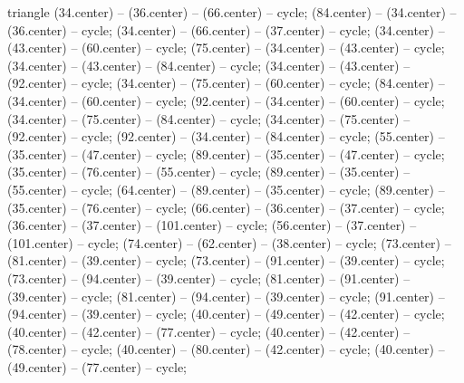 \begin{pgfonlayer}{triangle}
 (34.center) -- (36.center) -- (66.center) -- cycle; 
 (84.center) -- (34.center) -- (36.center) -- cycle; 
 (34.center) -- (66.center) -- (37.center) -- cycle; 
 (34.center) -- (43.center) -- (60.center) -- cycle; 
 (75.center) -- (34.center) -- (43.center) -- cycle; 
 (34.center) -- (43.center) -- (84.center) -- cycle; 
 (34.center) -- (43.center) -- (92.center) -- cycle; 
 (34.center) -- (75.center) -- (60.center) -- cycle; 
 (84.center) -- (34.center) -- (60.center) -- cycle; 
 (92.center) -- (34.center) -- (60.center) -- cycle; 
 (34.center) -- (75.center) -- (84.center) -- cycle; 
 (34.center) -- (75.center) -- (92.center) -- cycle; 
 (92.center) -- (34.center) -- (84.center) -- cycle; 
 (55.center) -- (35.center) -- (47.center) -- cycle; 
 (89.center) -- (35.center) -- (47.center) -- cycle; 
 (35.center) -- (76.center) -- (55.center) -- cycle; 
 (89.center) -- (35.center) -- (55.center) -- cycle; 
 (64.center) -- (89.center) -- (35.center) -- cycle; 
 (89.center) -- (35.center) -- (76.center) -- cycle; 
 (66.center) -- (36.center) -- (37.center) -- cycle; 
 (36.center) -- (37.center) -- (101.center) -- cycle; 
 (56.center) -- (37.center) -- (101.center) -- cycle; 
 (74.center) -- (62.center) -- (38.center) -- cycle; 
 (73.center) -- (81.center) -- (39.center) -- cycle; 
 (73.center) -- (91.center) -- (39.center) -- cycle; 
 (73.center) -- (94.center) -- (39.center) -- cycle; 
 (81.center) -- (91.center) -- (39.center) -- cycle; 
 (81.center) -- (94.center) -- (39.center) -- cycle; 
 (91.center) -- (94.center) -- (39.center) -- cycle; 
 (40.center) -- (49.center) -- (42.center) -- cycle; 
 (40.center) -- (42.center) -- (77.center) -- cycle; 
 (40.center) -- (42.center) -- (78.center) -- cycle; 
 (40.center) -- (80.center) -- (42.center) -- cycle; 
 (40.center) -- (49.center) -- (77.center) -- cycle; 

\end{pgfonlayer}
